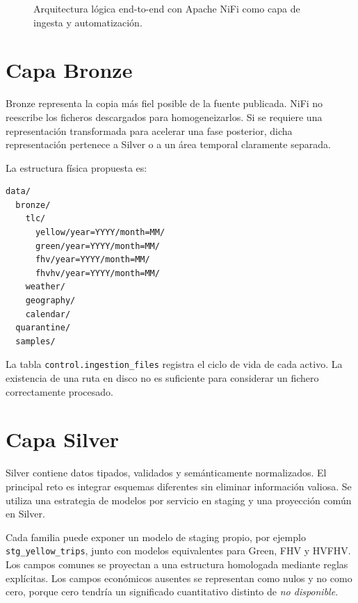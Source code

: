 \begin{figure}[H]
\centering
{}
\caption{Arquitectura lógica end-to-end con Apache NiFi como capa de ingesta y automatización.}%
\label{fig:architecture-overview}%
\end{figure}

\section{Capa Bronze}

Bronze representa la copia más fiel posible de la fuente publicada. NiFi no reescribe los ficheros descargados para homogeneizarlos. Si se requiere una representación transformada para acelerar una fase posterior, dicha representación pertenece a Silver o a un área temporal claramente separada.

La estructura física propuesta es:

\begin{lstlisting}[caption={Estructura lógica del almacenamiento Bronze.}]
data/
  bronze/
    tlc/
      yellow/year=YYYY/month=MM/
      green/year=YYYY/month=MM/
      fhv/year=YYYY/month=MM/
      fhvhv/year=YYYY/month=MM/
    weather/
    geography/
    calendar/
  quarantine/
  samples/
\end{lstlisting}

La tabla \texttt{control.ingestion\_files} registra el ciclo de vida de cada activo. La existencia de una ruta en disco no es suficiente para considerar un fichero correctamente procesado.

\section{Capa Silver}

Silver contiene datos tipados, validados y semánticamente normalizados. El principal reto es integrar esquemas diferentes sin eliminar información valiosa. Se utiliza una estrategia de modelos por servicio en staging y una proyección común en Silver.

Cada familia puede exponer un modelo de staging propio, por ejemplo \texttt{stg\_yellow\_\allowbreak{}trips}, junto con modelos equivalentes para Green, FHV y HVFHV\@. Los campos comunes se proyectan a una estructura homologada mediante reglas explícitas. Los campos económicos ausentes se representan como nulos y no como cero, porque cero tendría un significado cuantitativo distinto de \textit{no disponible}.

